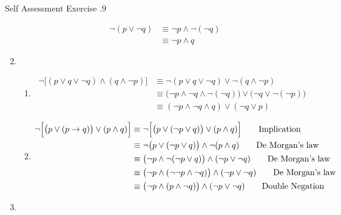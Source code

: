 \documentclass[../notes.tex]{subfiles}
\begin{document}
\begin{exercise}{Self Assessment Exercise \thechapter.9}
\begin{enumerate}
						\begin{align*}
							\lnot (p \lor \lnot q) &\equiv \lnot p \land \lnot (\lnot q) \tag*{De Morgan's law}\\
							&\equiv \lnot p \land q \tag*{Double Negation}
						\end{align*}
					\item {}
						\begin{enumerate}[label=(\alph*)]
							\item {}
								\begin{align*}
									\lnot \bigl[(p \lor q \lor \lnot q) \land (q \land \lnot p)\bigr] &\equiv \lnot(p \lor q \lor \lnot q) \lor \lnot(q \land \lnot p) \tag*{De Morgan's law}\\
									& \equiv \bigl(\lnot p \land \lnot q \land \lnot (\lnot q)\bigr) \lor \bigl(\lnot q \lor \lnot (\lnot p)\bigr) \tag*{De Morgan's law}\\
									& \equiv (\lnot p \land \lnot q \land q) \lor (\lnot q \lor p) \tag*{Double Negation}
								\end{align*}
							\item {}
								\begin{align*}
									\lnot \Bigl[\bigl(p \lor (p \rightarrow q)\bigr) \lor (p \land q)\Bigr] &\equiv \lnot \Bigl[\bigl(p \lor (\lnot p \lor q)\bigr) \lor (p \land q)\Bigr] \tag*{Implication}\\
									& \equiv \lnot \bigl(p \lor (\lnot p \lor q)\bigr) \land \lnot (p \land q) \tag*{De Morgan's law}\\
									& \equiv \bigl(\lnot p \land \lnot (\lnot p \lor q)\bigr) \land (\lnot p \lor \lnot q) \tag*{De Morgan's law}\\
									& \equiv \bigl(\lnot p \land (\lnot \lnot p \land \lnot q)\bigr) \land (\lnot p \lor \lnot q) \tag*{De Morgan's law}\\
									& \equiv \bigl(\lnot p \land (p \land \lnot q)\bigr) \land (\lnot p \lor \lnot q) \tag*{Double Negation}
								\end{align*}
						\end{enumerate}
					\item {}

\end{enumerate}
\end{exercise}
\end{document}

